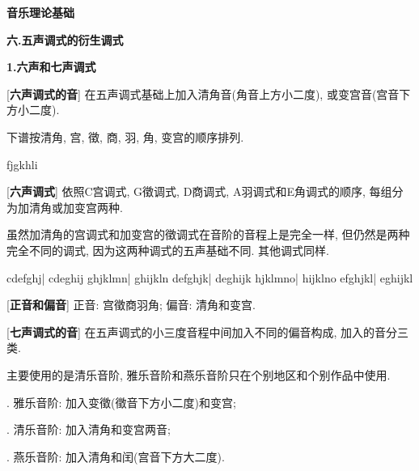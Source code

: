 

\begin{center} 
 \Large \textbf{音乐理论基础}\par
 \textbf{六.五声调式的衍生调式}
\end{center}

\large 
\begin{center}
 \textbf{1.六声和七声调式}\\
\end{center}

[\textbf{六声调式的音}] 在五声调式基础上加入清角音(角音上方小二度), 或变宫音(宫音下方小二度).\par
\qquad 下谱按清角, 宫, 徵, 商, 羽, 角, 变宫的顺序排列.\par
\startextract
\Notes \wh f\wh j\wh g\wh k\wh h\wh l\wh i\en
\zendextract

[\textbf{六声调式}] 依照C宫调式, G徵调式, D商调式, A羽调式和E角调式的顺序, 每组分为加清角或加变宫两种.\par
\qquad 虽然加清角的宫调式和加变宫的徵调式在音阶的音程上是完全一样, 但仍然是两种完全不同的调式, 因为这两种调式的五声基础不同. 其他调式同样. \par
\startextract
\Notes \wh c\wh d\wh e\wh f\wh g\wh h\wh j\en\bar
\Notes \wh c\wh d\wh e\wh g\wh h\wh i\wh j\en
\zendextract
\startextract{}
\Notes \wh g\wh h\wh j\wh k\wh l\wh m\wh n\en\bar
\Notes \wh g\wh h\wh i\wh j\wh k\wh l\wh n\en
\zendextract
\startextract{}
\Notes \wh d\wh e\wh f\wh g\wh h\wh j\wh k\en\bar
\Notes \wh d\wh e\wh g\wh h\wh i\wh j\wh k\en
\zendextract
\startextract{}
\Notes \wh h\wh j\wh k\wh l\wh m\wh n\wh o\en\bar
\Notes \wh h\wh i\wh j\wh k\wh l\wh n\wh o\en
\zendextract
\startextract{}
\Notes \wh e\wh f\wh g\wh h\wh j\wh k\wh l\en\bar
\Notes \wh e\wh g\wh h\wh i\wh j\wh k\wh l\en
\zendextract

[\textbf{正音和偏音}] 正音: 宫徵商羽角; 偏音: 清角和变宫.\par

[\textbf{七声调式的音}] 在五声调式的小三度音程中间加入不同的偏音构成, 加入的音分三类.\par
\qquad 主要使用的是清乐音阶, 雅乐音阶和燕乐音阶只在个别地区和个别作品中使用.\par
{}. 雅乐音阶: 加入变徵(徵音下方小二度)和变宫;\par
{}. 清乐音阶: 加入清角和变宫两音;\par
{}. 燕乐音阶: 加入清角和闰(宫音下方大二度).\par

